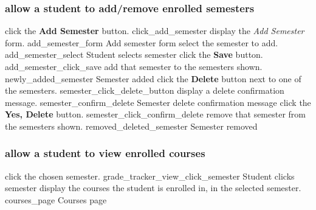 \documentclass[12pt]{article}
\newenvironment{requirement}[1]
{
    \renewcommand{\thesubsubsection}{R\arabic{subsubsection}.}
    \renewcommand{\labelenumi}{
        \arabic{subsubsection}.\arabic{enumi}
    }
    \renewcommand{\labelenumii}{
        \arabic{subsubsection}.\arabic{enumi}.\arabic{enumii}
    }
    \renewcommand{\labelenumiii}{
        \arabic{subsubsection}.\arabic{enumi}.\arabic{enumii}.\arabic{enumiii}
    }
    \renewcommand{\labelenumiv}{
        \arabic{subsubsection}.\arabic{enumi}.\arabic{enumii}.\arabic{enumiii}.\arabic{enumiv}
    }
    \subsubsection{#1}
    \begin{enumerate}
}
{
    \end{enumerate}
}
\begin{document}
\begin{requirement}{\sysshall allow a student to add/remove enrolled semesters}
    \navsemesters
    \screenshotstep
      {\stushall click the \textbf{Add Semester} button.}
      {click_add_semester}
      {}
    \screenshotstep
      {\sysshall display the \emph{Add Semester} form.}
      {add_semester_form}
      {Add semester form}
    \screenshotstep
      {\stushall select the semester to add.}
      {add_semester_select}
      {Student selects semester}
    \screenshotstep
      {\stushall click the \textbf{Save} button.}
      {add_semester_click_save}
      {}
    \screenshotstep
      {\sysshall add that semester to the semesters shown.}
      {newly_added_semester}
      {Semester added}
    \screenshotstep
      {\stushall click the \textbf{Delete} button next to one of the semesters.}
      {semester_click_delete_button}
      {}
    \screenshotstep
      {\sysshall display a delete confirmation message.}
      {semester_confirm_delete}
      {Semester delete confirmation message}
    \screenshotstep
      {\stushall click the \textbf{Yes, Delete} button.}
      {semester_click_confirm_delete}
      {}
    \screenshotstep
      {\sysshall remove that semester from the semesters shown.}
      {removed_deleted_semester}
      {Semester removed}
    \gotohome
\end{requirement}

\newcommand{\navcourses}{
    \navsemesters
    \screenshotstep
      {\stushall click the chosen semester.}
      {grade_tracker_view_click_semester}
      {Student clicks semester}
    \screenshotstep
      {\sysshall display the courses the student is enrolled in, in the selected semester.}
      {courses_page}
      {Courses page}
}

\begin{requirement}{\sysshall allow a student to view enrolled courses}
    \navcourses
\end{requirement}
\end{document}
